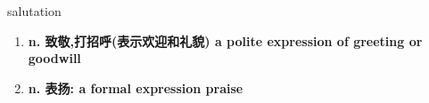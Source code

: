 
\begin{frame}
{\huge salutation}
\begin{center}
\begin{enumerate}\Large
  \item \textbf{n. 致敬,打招呼(表示欢迎和礼貌) a polite expression of greeting or goodwill}
  \item \textbf{n. 表扬: a formal expression praise}
\end{enumerate}
\end{center}
\end{frame}
